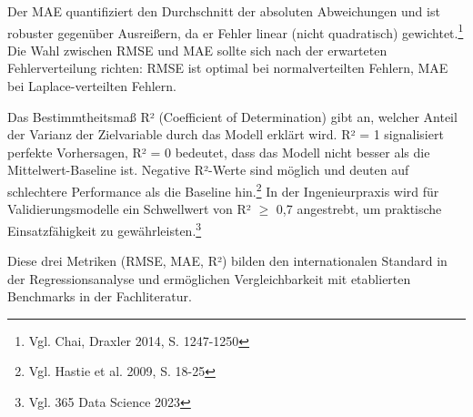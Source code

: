 Der \ac{MAE} quantifiziert den Durchschnitt der absoluten Abweichungen und ist robuster gegenüber Ausreißern, da er Fehler linear (nicht quadratisch) gewichtet.\footnote{Vgl. Chai, Draxler 2014, S. 1247-1250} Die Wahl zwischen RMSE und MAE sollte sich nach der erwarteten Fehlerverteilung richten: RMSE ist optimal bei normalverteilten Fehlern, MAE bei Laplace-verteilten Fehlern.

Das Bestimmtheitsmaß R² (Coefficient of Determination) gibt an, welcher Anteil der Varianz der Zielvariable durch das Modell erklärt wird. R² = 1 signalisiert perfekte Vorhersagen, R² = 0 bedeutet, dass das Modell nicht besser als die Mittelwert-Baseline ist. Negative R²-Werte sind möglich und deuten auf schlechtere Performance als die Baseline hin.\footnote{Vgl. Hastie et al. 2009, S. 18-25} In der Ingenieurpraxis wird für Validierungsmodelle ein Schwellwert von R² $\geq$ 0,7 angestrebt, um praktische Einsatzfähigkeit zu gewährleisten.\footnote{Vgl. 365 Data Science 2023}

Diese drei Metriken (RMSE, MAE, R²) bilden den internationalen Standard in der Regressionsanalyse und ermöglichen Vergleichbarkeit mit etablierten Benchmarks in der Fachliteratur.